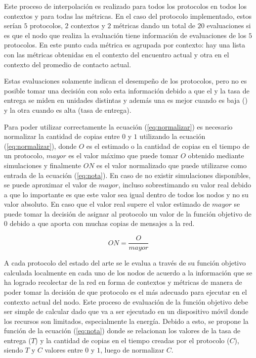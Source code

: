 Este proceso de interpolación es realizado para todos los protocolos en todos
los contextos y para todas las métricas. En el caso del protocolo implementado,
estos serían $5$ protocolos, $2$ contextos y $2$ métricas dando un total de $20$
evaluaciones si es que el nodo que realiza la evaluación tiene información de
evaluaciones de los $5$ protocolos. En este punto cada métrica es agrupada
por contexto: hay una lista con las métricas obtenidas en el contexto del
encuentro actual y otra en el contexto del promedio de contacto actual.


Estas evaluaciones solamente indican el desempeño de los protocolos, pero no es
posible tomar una decisión con solo esta información debido a que el \overhead{}
y la tasa de entrega se miden en unidades distintas y además una es mejor cuando
es baja (\overhead) y la otra cuando es alta (tasa de entrega).




Para poder utilizar correctamente la ecuación (\ref{eq:normalizar}) es necesario
normalizar la cantidad de copias entre $0$ y $1$ utilizando la ecuación
(\ref{eq:normalizar}), donde $O$ es el \overhead{} estimado o la cantidad de
copias en el tiempo de un protocolo, $mayor$ es el valor máximo que puede tomar
$O$ obtenido mediante simulaciones y finalmente $ON$ es el valor normalizado que
puede utilizarse como entrada de la ecuación (\ref{eq:nota}). En caso de no
existir simulaciones disponibles, se puede aproximar el valor de $mayor$,
incluso sobrestimando su valor real debido a que lo importante es que este valor
sea igual dentro de todos los nodos y no su valor absoluto. En caso que el valor
real supere el valor estimado de $mayor$ se puede tomar la decisión de asignar
al protocolo un valor de la función objetivo de $0$ debido a que aporta con
muchas copias de mensajes a la red.

\begin{equation}
  ON = \frac{O}{mayor}
  \label{eq:normalizar}
\end{equation}


A cada protocolo del estado del arte se le evalua a través de su función
objetivo calculada localmente en cada uno de los nodos de acuerdo a la
información que se ha logrado recolectar de la red en forma de contextos y
métricas de manera de poder tomar la decisión de que protocolo es el más
adecuado para ejecutar en el contexto actual del nodo. Este proceso de
evaluación de la función objetivo debe ser simple de calcular dado que va a ser
ejecutado en un dispositivo móvil donde los recursos son limitados,
especialmente la energía.  Debido a esto, se propone la función de la ecuación
(\ref{eq:nota}) donde se relacionan los valores de la tasa de entrega ($T$) y la
cantidad de copias en el tiempo creadas por el protocolo ($C$), siendo $T$ y $C$
valores entre $0$ y $1$, luego de normalizar $C$.

